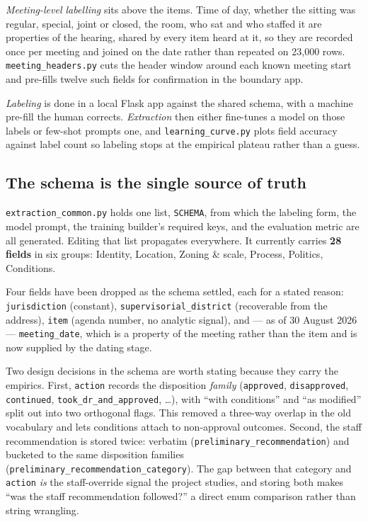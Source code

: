 \documentclass[11pt]{article}
\begin{document}
\emph{Meeting-level labelling} sits above the items. Time of day, whether the sitting was
regular, special, joint or closed, the room, who sat and who staffed it are properties of
the hearing, shared by every item heard at it, so they are recorded once per meeting and
joined on the date rather than repeated on 23{,}000 rows.
\texttt{meeting\_headers.py} cuts the header window around each known meeting start and
pre-fills twelve such fields for confirmation in the boundary app.

\emph{Labeling} is done in a local Flask app against the shared schema, with a machine
pre-fill the human corrects. \emph{Extraction} then either fine-tunes a model on those
labels or few-shot prompts one, and \texttt{learning\_curve.py} plots field accuracy
against label count so labeling stops at the empirical plateau rather than a guess.

\subsection{The schema is the single source of truth}

\texttt{extraction\_common.py} holds one list, \texttt{SCHEMA}, from which the labeling
form, the model prompt, the training builder's required keys, and the evaluation metric
are all generated. Editing that list propagates everywhere. It currently carries
\textbf{28 fields} in six groups: Identity, Location, Zoning \& scale, Process, Politics,
Conditions.

Four fields have been dropped as the schema settled, each for a stated reason:
\texttt{jurisdiction} (constant), \texttt{supervisorial\_district} (recoverable from the
address), \texttt{item} (agenda number, no analytic signal), and --- as of 30 August 2026
--- \texttt{meeting\_date}, which is a property of the meeting rather than the item and is
now supplied by the dating stage.

Two design decisions in the schema are worth stating because they carry the empirics.
First, \texttt{action} records the disposition \emph{family} (\texttt{approved},
\texttt{disapproved}, \texttt{continued}, \texttt{took\_dr\_and\_approved}, \ldots), with
``with conditions'' and ``as modified'' split out into two orthogonal flags. This removed a
three-way overlap in the old vocabulary and lets conditions attach to non-approval
outcomes. Second, the staff recommendation is stored twice: verbatim
(\texttt{preliminary\_recommendation}) and bucketed to the same disposition families
(\texttt{preliminary\_recommendation\_category}). The gap between that category and
\texttt{action} \emph{is} the staff-override signal the project studies, and storing both
makes ``was the staff recommendation followed?'' a direct enum comparison rather than
string wrangling.
\end{document}
